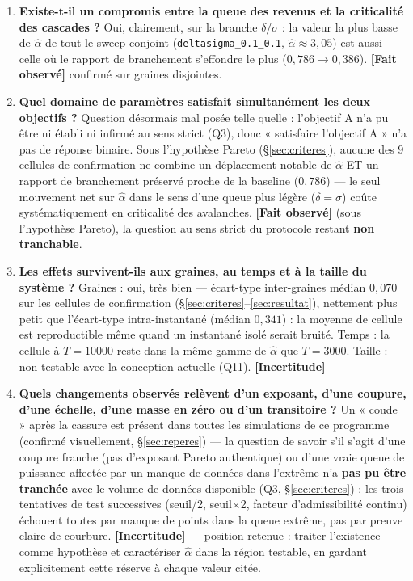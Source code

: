 \documentclass[11pt,a4paper]{article}
\newcommand{\code}[1]{\texttt{#1}}
\newcommand{\fait}{\textbf{[Fait observé]}}
\newcommand{\incertitude}{\textbf{[Incertitude]}}
\begin{document}
\begin{enumerate}
\item \textbf{Existe-t-il un compromis entre la queue des revenus et la
  criticalité des cascades ?} Oui, clairement, sur la branche
  $\delta/\sigma$ : la valeur la plus basse de $\hat\alpha$ de tout le
  sweep conjoint (\code{deltasigma\_0.1\_0.1}, $\hat\alpha\approx3{,}05$)
  est aussi celle où le rapport de branchement s'effondre le plus
  ($0{,}786 \to 0{,}386$). \fait{} confirmé sur graines disjointes.

\item \textbf{Quel domaine de paramètres satisfait simultanément les
  deux objectifs ?} Question désormais mal posée telle quelle :
  l'objectif A n'a pu être ni établi ni infirmé au sens strict (Q3),
  donc « satisfaire l'objectif A » n'a pas de réponse binaire. Sous
  l'hypothèse Pareto (\S\ref{sec:criteres}), aucune des 9 cellules de
  confirmation ne combine un déplacement notable de $\hat\alpha$ ET un
  rapport de branchement préservé proche de la baseline ($0{,}786$) ---
  le seul mouvement net sur $\hat\alpha$ dans le sens d'une queue plus
  légère ($\delta=\sigma$) coûte systématiquement en criticalité des
  avalanches. \fait{} (sous l'hypothèse Pareto), la question au sens
  strict du protocole restant \textbf{non tranchable}.

\item \textbf{Les effets survivent-ils aux graines, au temps et à la
  taille du système ?} Graines : oui, très bien --- écart-type
  inter-graines médian $0{,}070$ sur les cellules de confirmation
  (\S\ref{sec:criteres}--\ref{sec:resultat}), nettement plus petit que
  l'écart-type intra-instantané (médian $0{,}341$) : la moyenne de
  cellule est reproductible même quand un instantané isolé serait
  bruité. Temps : la cellule à $T=10000$ reste dans la même gamme de
  $\hat\alpha$ que $T=3000$. Taille : non testable avec la conception
  actuelle (Q11). \incertitude{}

\item \textbf{Quels changements observés relèvent d'un exposant, d'une
  coupure, d'une échelle, d'une masse en zéro ou d'un transitoire ?} Un
  « coude » après la cassure est présent dans toutes les simulations de
  ce programme (confirmé visuellement, \S\ref{sec:reperes}) --- la
  question de savoir s'il s'agit d'une coupure franche (pas d'exposant
  Pareto authentique) ou d'une vraie queue de puissance affectée par un
  manque de données dans l'extrême n'a \textbf{pas pu être tranchée}
  avec le volume de données disponible (Q3, \S\ref{sec:criteres}) : les
  trois tentatives de test successives (seuil/2, seuil$\times$2, facteur
  d'admissibilité continu) échouent toutes par manque de points dans la
  queue extrême, pas par preuve claire de courbure. \incertitude{} ---
  position retenue : traiter l'existence comme hypothèse et caractériser
  $\hat\alpha$ dans la région testable, en gardant explicitement cette
  réserve à chaque valeur citée.


\end{enumerate}
\end{document}
